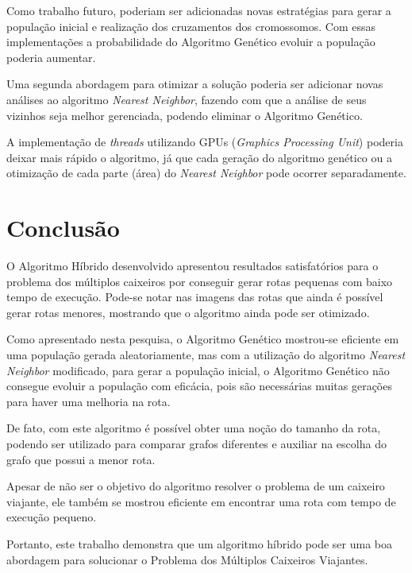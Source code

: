\documentclass[12pt,openright,a4paper,oneside]{tcc}
\begin{document}
	Como trabalho futuro, poderiam ser adicionadas novas estratégias para gerar a população inicial e realização dos cruzamentos dos cromossomos. Com essas implementações a probabilidade do Algoritmo Genético evoluir a população poderia aumentar.

	Uma segunda abordagem para otimizar a solução poderia ser adicionar novas análises ao algoritmo \textit{Nearest Neighbor}, fazendo com que a análise de seus vizinhos seja melhor gerenciada, podendo eliminar o Algoritmo Genético.

	A implementação de \textit{threads} utilizando GPUs (\textit{Graphics Processing Unit}) poderia deixar mais rápido o algoritmo, já que cada geração do algoritmo genético ou a otimização de cada parte (área) do \textit{Nearest Neighbor} pode ocorrer separadamente. 
	

	\chapter{Conclusão}
		
	O Algoritmo Híbrido desenvolvido apresentou resultados satisfatórios para o problema dos múltiplos caixeiros por conseguir gerar rotas pequenas com baixo tempo de execução. Pode-se notar nas imagens das rotas que ainda é possível gerar rotas menores, mostrando que o algoritmo ainda pode ser otimizado.

    Como apresentado nesta pesquisa, o Algoritmo Genético mostrou-se eficiente em uma população gerada aleatoriamente, mas com a utilização do algoritmo \textit{Nearest Neighbor} modificado, para gerar a população inicial, o Algoritmo Genético não consegue evoluir a população com eficácia, pois são necessárias muitas gerações para haver uma melhoria na rota.

    De fato, com este algoritmo é possível obter uma noção do tamanho da rota, podendo ser utilizado para comparar grafos diferentes e auxiliar na escolha do grafo que possui a menor rota.

    Apesar de não ser o objetivo do algoritmo resolver o problema de um caixeiro viajante, ele também se mostrou eficiente em encontrar uma rota com tempo de execução pequeno.

    Portanto, este trabalho demonstra que um algoritmo híbrido pode ser uma boa abordagem para solucionar o Problema dos Múltiplos Caixeiros Viajantes.  


	\postextual
	
\end{document}
